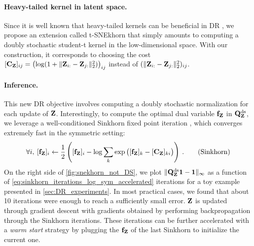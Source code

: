 \paragraph{Heavy-tailed kernel in latent space.}
Since it is well known that heavy-tailed kernels can be beneficial in DR
\citep{kobak2020heavy}, we propose an extension called t-SNEkhorn that
simply amounts to computing a doubly stochastic student-t kernel 
in the low-dimensional space. With our construction, it corresponds to choosing the cost $[\mathbf{C}_{\mathbf{Z}}]_{ij} = \left(\log(1 + \|\mathbf{Z}_{i:}-\mathbf{Z}_{j:}\|_2^2)\right)_{ij}$
instead of $(\|\mathbf{Z}_{i:}-\mathbf{Z}_{j:}\|_2^2)_{ij}$.

\paragraph{Inference.}
This new DR objective involves computing a doubly stochastic normalization for each update of $\mathbf{Z}$. Interestingly, to compute the optimal dual variable $\mathbf{f}_{\mathbf{Z}}$ in $\mathbf{Q}^{\mathrm{ds}}_{\mathbf{Z}}$, we leverage a well-conditioned Sinkhorn fixed point iteration \citep{knight2014symmetry, feydy2019interpolating}, which converges extremely fast in the symmetric setting:
\begin{equation}\label{eq:sinkhorn_iterations_log_sym_accelerated}
    \forall i, \: 
    [\mathbf{f}_{\mathbf{Z}}]_i \leftarrow \frac{1}{2} \left( [\mathbf{f}_{\mathbf{Z}}]_i - \log \sum_{k} \exp \big([\mathbf{f}_{\mathbf{Z}}]_k - [\mathbf{C}_{\mathbf{Z}}]_{ki} \big) \right) \:.
\tag{Sinkhorn}
\end{equation}
On the right side of \cref{fig:snekhorn_not_DS}, we plot $\| \mathbf{Q}^{\mathrm{ds}}_{\mathbf{Z}} \bm{1} - \bm{1} \|_{\infty}$ as a function of \eqref{eq:sinkhorn_iterations_log_sym_accelerated} iterations for a toy example presented in \cref{sec:DR_experiments}. In most practical cases, we found that about 10 iterations were enough to reach a sufficiently small error. 
$\mathbf{Z}$ is updated through gradient descent with gradients obtained by performing backpropagation through the Sinkhorn iterations. These
iterations can be further accelerated with a \emph{warm start} strategy by plugging the $\mathbf{f}_{\mathbf{Z}}$ of the last Sinkhorn to initialize the current one.


